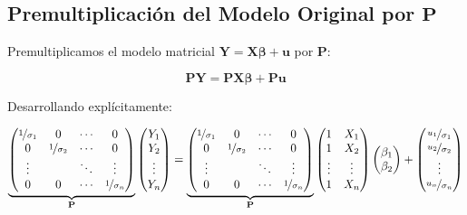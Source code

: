 \documentclass[12pt,a4paper]{article}
\begin{document}
\subsection{Premultiplicación del Modelo Original por $\mathbf{P}$}

Premultiplicamos el modelo matricial $\mathbf{Y} = \mathbf{X}\boldsymbol{\beta} + \mathbf{u}$ por $\mathbf{P}$:

\begin{equation}
\mathbf{P}\mathbf{Y} = \mathbf{P}\mathbf{X}\boldsymbol{\beta} + \mathbf{P}\mathbf{u}
\end{equation}

Desarrollando explícitamente:

\begin{equation}
\underbrace{
\begin{pmatrix}
\nicefrac{1}{\sigma_1} & 0 & \cdots & 0 \\
0 & \nicefrac{1}{\sigma_2} & \cdots & 0 \\
\vdots & & \ddots & \vdots \\
0 & 0 & \cdots & \nicefrac{1}{\sigma_n}
\end{pmatrix}
}_{\mathbf{P}}
\begin{pmatrix} Y_1 \\ Y_2 \\ \vdots \\ Y_n \end{pmatrix}
=
\underbrace{
\begin{pmatrix}
\nicefrac{1}{\sigma_1} & 0 & \cdots & 0 \\
0 & \nicefrac{1}{\sigma_2} & \cdots & 0 \\
\vdots & & \ddots & \vdots \\
0 & 0 & \cdots & \nicefrac{1}{\sigma_n}
\end{pmatrix}
}_{\mathbf{P}}
\begin{pmatrix} 1 & X_1 \\ 1 & X_2 \\ \vdots & \vdots \\ 1 & X_n \end{pmatrix}
\begin{pmatrix} \beta_1 \\ \beta_2 \end{pmatrix}
+
\begin{pmatrix} \nicefrac{u_1}{\sigma_1} \\ \nicefrac{u_2}{\sigma_2} \\ \vdots \\ \nicefrac{u_n}{\sigma_n} \end{pmatrix}
\end{equation}
\end{document}
